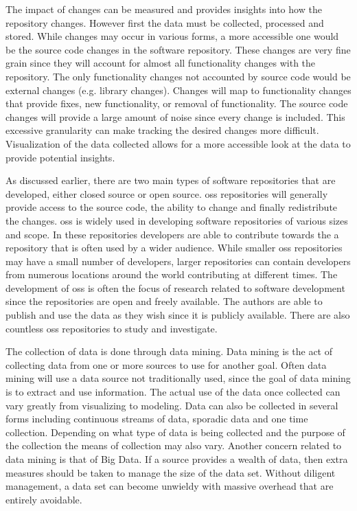 The impact of changes can be measured and provides insights into how the repository changes. However first the data must be collected, processed and stored. While changes may occur in various forms, a more accessible one would be the source code changes in the software repository. These changes are very fine grain since they will account for almost all functionality changes with the repository. The only functionality changes not accounted by source code would be external changes (e.g. library changes). Changes will map to functionality changes that provide fixes, new functionality, or removal of functionality. The source code changes will provide a large amount of noise since every change is included. This excessive granularity can make tracking the desired changes more difficult. Visualization of the data collected allows for a more accessible look at the data to provide potential insights.



As discussed earlier, there are two main types of software repositories that are developed, either closed source or open source. \gls{oss} repositories will generally provide access to the source code, the ability to change and finally redistribute the changes. \gls{oss} is widely used in developing software repositories of various sizes and scope. In these repositories developers are able to contribute towards the a repository that is often used by a wider audience. While smaller \gls{oss} repositories may have a small number of developers, larger repositories can contain developers from numerous locations around the world contributing at different times. The development of \gls{oss} is often the focus of research related to software development since the repositories are open and freely available. The authors are able to publish and use the data as they wish since it is publicly available. There are also countless \gls{oss} repositories to study and investigate.

The collection of data is done through data mining. Data mining is the act of collecting data from one or more sources to use for another goal. Often data mining will use a data source not traditionally used, since the goal of data mining is to extract and use information. The actual use of the data once collected can vary greatly from visualizing to modeling. Data can also be collected in several forms including continuous streams of data, sporadic data and one time collection. Depending on what type of data is being collected and the purpose of the collection the means of collection may also vary. Another concern related to data mining is that of Big Data. If a source provides a wealth of data, then extra measures should be taken to manage the size of the data set. Without diligent management, a data set can become unwieldy with massive overhead that are entirely avoidable.

